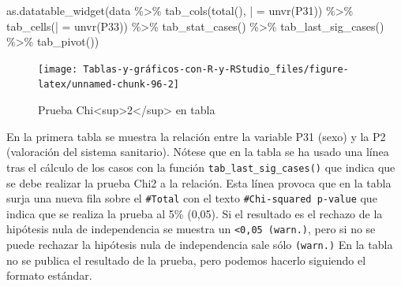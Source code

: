 \documentclass[
]{book}
\newenvironment{Shaded}{\begin{snugshade}}{\end{snugshade}}
\newcommand{\AttributeTok}[1]{\textcolor[rgb]{0.77,0.63,0.00}{#1}}
\newcommand{\FunctionTok}[1]{\textcolor[rgb]{0.00,0.00,0.00}{#1}}
\newcommand{\NormalTok}[1]{#1}
\newcommand{\OtherTok}[1]{\textcolor[rgb]{0.56,0.35,0.01}{#1}}
\newcommand{\SpecialCharTok}[1]{\textcolor[rgb]{0.00,0.00,0.00}{#1}}
\newcommand{\StringTok}[1]{\textcolor[rgb]{0.31,0.60,0.02}{#1}}
\begin{document}
\begin{Shaded}
\begin{Highlighting}[]
\FunctionTok{as.datatable\_widget}\NormalTok{(data }\SpecialCharTok{\%\textgreater{}\%} \FunctionTok{tab\_cols}\NormalTok{(}\FunctionTok{total}\NormalTok{(), }\StringTok{\textasciigrave{}}\AttributeTok{|}\StringTok{\textasciigrave{}} \OtherTok{=} \FunctionTok{unvr}\NormalTok{(P31)) }\SpecialCharTok{\%\textgreater{}\%} 
  \FunctionTok{tab\_cells}\NormalTok{(}\StringTok{\textasciigrave{}}\AttributeTok{|}\StringTok{\textasciigrave{}} \OtherTok{=} \FunctionTok{unvr}\NormalTok{(P33)) }\SpecialCharTok{\%\textgreater{}\%} \FunctionTok{tab\_stat\_cases}\NormalTok{() }\SpecialCharTok{\%\textgreater{}\%} \FunctionTok{tab\_last\_sig\_cases}\NormalTok{() }\SpecialCharTok{\%\textgreater{}\%} 
  \FunctionTok{tab\_pivot}\NormalTok{())}
\end{Highlighting}
\end{Shaded}

\begin{figure}[H]

{\centering \texttt{[image: Tablas-y-gráficos-con-R-y-RStudio\_files/figure-latex/unnamed-chunk-96-2]} 

}

\caption{Prueba Chi<sup>2</sup> en tabla}\label{fig:unnamed-chunk-96}
\end{figure}

En la primera tabla se muestra la relación entre la variable P31 (sexo) y la P2 (valoración del sistema sanitario). Nótese que en la tabla se ha usado una línea tras el cálculo de los casos con la función \texttt{tab\_last\_sig\_cases()} que indica que se debe realizar la prueba Chi2 a la relación. Esta línea provoca que en la tabla surja una nueva fila sobre el \texttt{\#Total} con el texto \texttt{\#Chi-squared\ p-value} que indica que se realiza la prueba al 5\% (0,05). Si el resultado es el rechazo de la hipótesis nula de independencia se muestra un \texttt{\textless{}0,05\ (warn.)}, pero si no se puede rechazar la hipótesis nula de independencia sale sólo \texttt{(warn.)} En la tabla no se publica el resultado de la prueba, pero podemos hacerlo siguiendo el formato estándar.

\begin{Shaded}
\end{Shaded}
\end{document}
